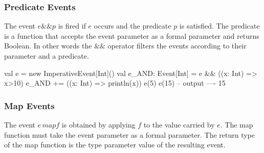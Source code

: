 \documentclass[10pt,a4paper]{article}
\newcommand{\code}[1]{{\fontfamily{cmtt}\small\selectfont#1}}
\begin{document}
\subsubsection{Predicate Events}

The event $e \&\& p$ is fired if $e$ occurs and the predicate $p$ is
satisfied. The predicate is a function that accepts the event
parameter as a formal parameter and returns \code{Boolean}. In other
words the $\&\&$ operator filters the events according to their
parameter and a predicate.

\begin{codenv}
val e = new ImperativeEvent[Int]()
val e_AND: Event[Int] = e && ((x: Int) => x>10)
e_AND += ((x: Int) => println(x))
e(5)
e(15)
-- output ----
15
\end{codenv}


\subsubsection{Map Events}

The event $e\,map f$ is obtained by applying $f$ to the value carried
by $e$. The map function must take the event parameter as a formal
parameter. The return type of the map function is the type parameter
value of the resulting event.





%
%
%
%
%
%
\end{document}
